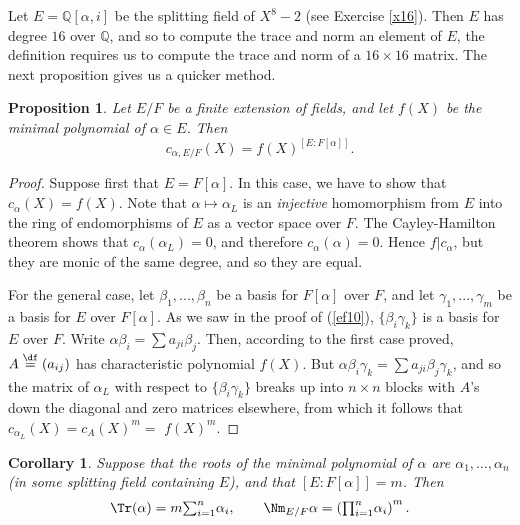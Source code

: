 \documentclass[a4paper,11pt,final,openany]{memoir}
\newtheorem{corollary}[X]{Corollary}
\newtheorem{proposition}[X]{Proposition}
\theoremstyle{nonumberplain}
\newtheorem{proof}{Proof.}
\begin{document}
Let $E=\mathbb{Q}[\alpha,i]$ be the splitting field of $X^{8}-2$ (see Exercise
\ref{x16}). Then $E$ has degree $16$ over $\mathbb{Q}{}$, and so to compute
the trace and norm an element of $E$, the definition requires us to compute
the trace and norm of a $16\times16$ matrix. The next proposition gives us a
quicker method.

\begin{proposition}
\label{ag33}Let $E/F$ be a finite extension of fields, and let $f(X)$ be the
minimal polynomial of $\alpha\in E$. Then
\[
c_{\alpha,E/F}(X)=f(X)^{[E\colon F[\alpha]]}.
\]

\end{proposition}

\begin{proof}
Suppose first that $E=F[\alpha]$. In this case, we have to show that
$c_{\alpha}(X)=f(X)$. Note that $\alpha\mapsto\alpha_{L}$ is an
\emph{injective\/} homomorphism from $E$ into the ring of endomorphisms of $E$
as a vector space over $F$. The Cayley-Hamilton theorem shows that $c_{\alpha
}(\alpha_{L})=0$, and therefore $c_{\alpha}(\alpha)=0$. Hence $f|c_{\alpha}$,
but they are monic of the same degree, and so they are equal.

For the general case, let $\beta_{1},...,\beta_{n}$ be a basis for $F[\alpha]$
over $F$, and let $\gamma_{1},...,\gamma_{m}$ be a basis for $E$ over
$F[\alpha]$. As we saw in the proof of (\ref{ef10}), $\{\beta_{i}\gamma_{k}\}$
is a basis for $E$ over $F$. Write $\alpha\beta_{i}=\sum a_{ji}\beta_{j}$.
Then, according to the first case proved, $A\overset{\df%
}{=}(a_{ij})$ has characteristic polynomial $f(X)$. But $\alpha\beta_{i}%
\gamma_{k}=\sum a_{ji}\beta_{j}\gamma_{k}$, and so the matrix of $\alpha_{L}$
with respect to $\{\beta_{i}\gamma_{k}\}$ breaks up into $n\times n$ blocks
with $A$'s down the diagonal and zero matrices elsewhere, from which it
follows that $c_{\alpha_{L}}(X)=c_{A}(X)^{m}=$ $f(X)^{m}.$
\end{proof}

\begin{corollary}
\label{ag34}Suppose that the roots of the minimal polynomial of $\alpha$ are
$\alpha_{1},\ldots,\alpha_{n}$ (in some splitting field containing $E$), and
that $[E\colon F[\alpha]]=m$. Then
\[
\Tr(\alpha)=m%
{\textstyle\sum\nolimits_{i=1}^{n}}
\alpha_{i},\qquad\Nm_{E/F}\alpha=\left(
{\textstyle\prod\nolimits_{i=1}^{n}}
\alpha_{i}\right)  ^{m}.
\]

\end{corollary}
\end{document}
